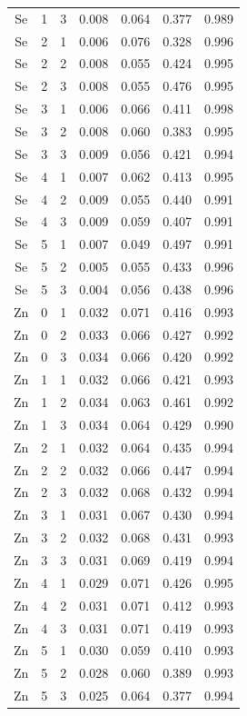 \documentclass[ms, hidelinks]{uncgdissertationexp3}
\theoremstyle{plain}
\theoremstyle{definition}
\theoremstyle{remark}
\begin{document}
\begin{longtable}{ccccccc}
  Se & 1 & 3 & 0.008 & 0.064 & 0.377 & 0.989\\
  \rowcolor{gray!6}  Se & 2 & 1 & 0.006 & 0.076 & 0.328 & 0.996\\
  Se & 2 & 2 & 0.008 & 0.055 & 0.424 & 0.995\\
  \rowcolor{gray!6}  Se & 2 & 3 & 0.008 & 0.055 & 0.476 & 0.995\\
  Se & 3 & 1 & 0.006 & 0.066 & 0.411 & 0.998\\
  \rowcolor{gray!6}  Se & 3 & 2 & 0.008 & 0.060 & 0.383 & 0.995\\
  Se & 3 & 3 & 0.009 & 0.056 & 0.421 & 0.994\\
  \rowcolor{gray!6}  Se & 4 & 1 & 0.007 & 0.062 & 0.413 & 0.995\\
  Se & 4 & 2 & 0.009 & 0.055 & 0.440 & 0.991\\
  \rowcolor{gray!6}  Se & 4 & 3 & 0.009 & 0.059 & 0.407 & 0.991\\
  Se & 5 & 1 & 0.007 & 0.049 & 0.497 & 0.991\\
  \rowcolor{gray!6}  Se & 5 & 2 & 0.005 & 0.055 & 0.433 & 0.996\\
  Se & 5 & 3 & 0.004 & 0.056 & 0.438 & 0.996\\
  \rowcolor{gray!6}  Zn & 0 & 1 & 0.032 & 0.071 & 0.416 & 0.993\\
  Zn & 0 & 2 & 0.033 & 0.066 & 0.427 & 0.992\\
  \rowcolor{gray!6}  Zn & 0 & 3 & 0.034 & 0.066 & 0.420 & 0.992\\
  Zn & 1 & 1 & 0.032 & 0.066 & 0.421 & 0.993\\
  \rowcolor{gray!6}  Zn & 1 & 2 & 0.034 & 0.063 & 0.461 & 0.992\\
  Zn & 1 & 3 & 0.034 & 0.064 & 0.429 & 0.990\\
  \rowcolor{gray!6}  Zn & 2 & 1 & 0.032 & 0.064 & 0.435 & 0.994\\
  Zn & 2 & 2 & 0.032 & 0.066 & 0.447 & 0.994\\
  \rowcolor{gray!6}  Zn & 2 & 3 & 0.032 & 0.068 & 0.432 & 0.994\\
  Zn & 3 & 1 & 0.031 & 0.067 & 0.430 & 0.994\\
  \rowcolor{gray!6}  Zn & 3 & 2 & 0.032 & 0.068 & 0.431 & 0.993\\
  Zn & 3 & 3 & 0.031 & 0.069 & 0.419 & 0.994\\
  \rowcolor{gray!6}  Zn & 4 & 1 & 0.029 & 0.071 & 0.426 & 0.995\\
  Zn & 4 & 2 & 0.031 & 0.071 & 0.412 & 0.993\\
  \rowcolor{gray!6}  Zn & 4 & 3 & 0.031 & 0.071 & 0.419 & 0.993\\
  Zn & 5 & 1 & 0.030 & 0.059 & 0.410 & 0.993\\
  \rowcolor{gray!6}  Zn & 5 & 2 & 0.028 & 0.060 & 0.389 & 0.993\\
  Zn & 5 & 3 & 0.025 & 0.064 & 0.377 & 0.994\\*
  \end{longtable}
\end{document}
